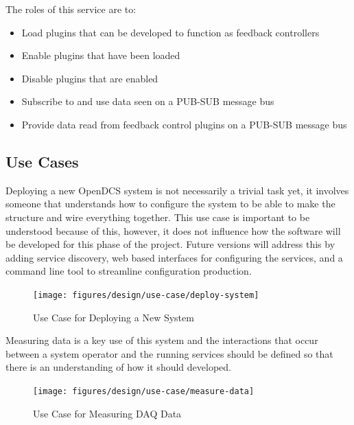       The roles of this service are to:

      \begin{itemize}
        \item Load plugins that can be developed to function as feedback
          controllers
        \item Enable plugins that have been loaded
        \item Disable plugins that are enabled
        \item Subscribe to and use data seen on a PUB-SUB message bus
        \item Provide data read from feedback control plugins on a PUB-SUB
          message bus
      \end{itemize}

  \subsection{Use Cases}\label{sec:dsg-use}


    Deploying a new OpenDCS system is not necessarily a trivial task yet, it
    involves someone that understands how to configure the system to be able
    to make the structure and wire everything together. This use case is
    important to be understood because of this, however, it does not influence
    how the software will be developed for this phase of the project. Future
    versions will address this by adding service discovery, web based interfaces
    for configuring the services, and a command line tool to streamline
    configuration production.

    \begin{figure}[H]
      \texttt{[image: figures/design/use-case/deploy-system]}
      \caption{Use Case for Deploying a New System}
      \label{fig:dsg-use-deploy}
    \end{figure}

    \newpage

    Measuring data is a key use of this system and the interactions that occur
    between a system operator and the running services should be defined so that
    there is an understanding of how it should developed.

    \begin{figure}[H]
      \texttt{[image: figures/design/use-case/measure-data]}
      \caption{Use Case for Measuring DAQ Data}
      \label{fig:dsg-use-measure}
    \end{figure}

